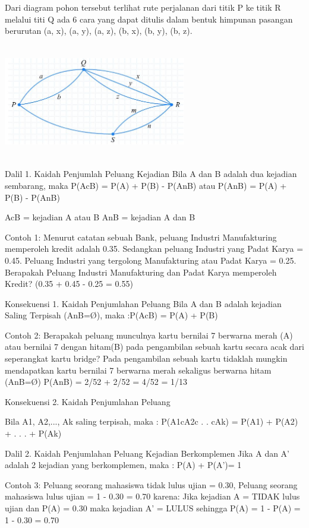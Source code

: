 \documentclass[11pt,fleqn]{book} %
\begin{document}
 Dari diagram pohon tersebut terlihat rute perjalanan dari titik P ke titik R melalui titi Q ada 6 cara yang dapat ditulis dalam bentuk himpunan pasangan berurutan {(a, x), (a, y), (a, z), (b, x), (b, y), (b, z)}.

 
 \includegraphics[width = 8cm, height= 5cm]{Pictures/contoh3b.JPG}
 
Dalil 1. Kaidah Penjumlah Peluang Kejadian
Bila A dan B adalah dua kejadian sembarang, maka
P(AcB) = P(A) + P(B) - P(AnB)
atau
P(AnB) = P(A) + P(B) - P(AnB)

AcB = kejadian A atau B                        AnB = kejadian A dan B

 Contoh 1:
Menurut catatan sebuah Bank, peluang Industri Manufakturing memperoleh kredit adalah
0.35. Sedangkan peluang Industri yang Padat Karya = 0.45. Peluang Industri yang
tergolong Manufakturing atau Padat Karya = 0.25. Berapakah Peluang Industri
Manufakturing dan Padat Karya memperoleh Kredit? (0.35 + 0.45 - 0.25 = 0.55)

Konsekuensi 1. Kaidah Penjumlahan Peluang
Bila A dan B adalah kejadian Saling Terpisah (AnB=Ø), maka :P(AcB) = P(A) + P(B)

Contoh 2:
Berapakah peluang munculnya kartu bernilai 7 berwarna merah (A) atau bernilai 7 dengan
hitam(B) pada pengambilan sebuah kartu secara acak dari seperangkat kartu bridge?
Pada pengambilan sebuah kartu tidaklah mungkin mendapatkan kartu bernilai 7 berwarna
merah sekaligus berwarna hitam (AnB=Ø)
P(AnB) = 2/52 + 2/52 = 4/52 = 1/13

Konsekuensi 2. Kaidah Penjumlahan Peluang

Bila A1, A2,..., Ak saling terpisah, maka :
P(A1cA2c . . cAk) = P(A1) + P(A2) + . . . + P(Ak)

Dalil 2. Kaidah Penjumlahan Peluang Kejadian Berkomplemen
Jika A dan A' adalah 2 kejadian yang berkomplemen, maka :
P(A) + P(A')= 1

Contoh 3:
Peluang seorang mahasiswa tidak lulus ujian = 0.30, Peluang seorang mahasiswa lulus
ujian = 1 - 0.30 = 0.70
karena:
Jika kejadian A = TIDAK lulus ujian dan P(A) = 0.30
maka kejadian A’ = LULUS sehingga P(A) = 1 - P(A) = 1 - 0.30 = 0.70
 
\end{document}
